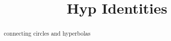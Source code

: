 \documentclass{ximera}
\title{Hyp Identities}
\begin{document}
\begin{abstract}
connecting circles and hyperbolas
\end{abstract}
\maketitle
\end{document}
